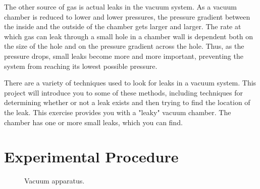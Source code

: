 The other source of gas is actual leaks in the vacuum system. As a vacuum chamber is reduced to lower and lower pressures, the pressure gradient between the inside and the outside of the chamber gets larger and larger. The rate at which gas can leak through a small hole in a chamber wall is dependent both on the size of the hole and on the pressure gradient across the hole. Thus, as the pressure drops, small leaks become more and more important, preventing the system from reaching its lowest possible pressure.

There are a variety of techniques used to look for leaks in a vacuum system. This project will introduce you to some of these methods, including techniques for determining whether or not a leak exists and then trying to find the location of the leak. This exercise provides you with a "leaky" vacuum chamber. The chamber has one or more small leaks, which you can find.

\section{Experimental Procedure}

\begin{figure}
\caption{Vacuum apparatus.}
\label{fig:vac3}
\end{figure}


